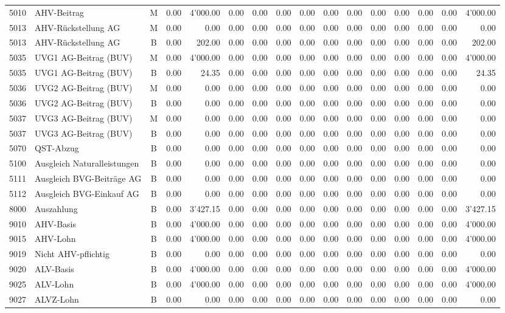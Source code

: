 \documentclass[8pt,a4paper]{extarticle}
\begin{document}
\begin{longtable}{@{\extracolsep{\fill}} l l c r r r r r r r r r r r r r}
5010&AHV-Beitrag&M&0.00&4'000.00&0.00&0.00&0.00&0.00&0.00&0.00&0.00&0.00&0.00&0.00&4'000.00\\
5013&AHV-Rückstellung AG&M&0.00&0.00&0.00&0.00&0.00&0.00&0.00&0.00&0.00&0.00&0.00&0.00&0.00\\
5013&AHV-Rückstellung AG&B&0.00&202.00&0.00&0.00&0.00&0.00&0.00&0.00&0.00&0.00&0.00&0.00&202.00\\
5035&UVG1 AG-Beitrag (BUV)&M&0.00&4'000.00&0.00&0.00&0.00&0.00&0.00&0.00&0.00&0.00&0.00&0.00&4'000.00\\
5035&UVG1 AG-Beitrag (BUV)&B&0.00&24.35&0.00&0.00&0.00&0.00&0.00&0.00&0.00&0.00&0.00&0.00&24.35\\
5036&UVG2 AG-Beitrag (BUV)&M&0.00&0.00&0.00&0.00&0.00&0.00&0.00&0.00&0.00&0.00&0.00&0.00&0.00\\
5036&UVG2 AG-Beitrag (BUV)&B&0.00&0.00&0.00&0.00&0.00&0.00&0.00&0.00&0.00&0.00&0.00&0.00&0.00\\
5037&UVG3 AG-Beitrag (BUV)&M&0.00&0.00&0.00&0.00&0.00&0.00&0.00&0.00&0.00&0.00&0.00&0.00&0.00\\
5037&UVG3 AG-Beitrag (BUV)&B&0.00&0.00&0.00&0.00&0.00&0.00&0.00&0.00&0.00&0.00&0.00&0.00&0.00\\
5070&QST-Abzug&B&0.00&0.00&0.00&0.00&0.00&0.00&0.00&0.00&0.00&0.00&0.00&0.00&0.00\\
5100&Ausgleich Naturalleistungen&B&0.00&0.00&0.00&0.00&0.00&0.00&0.00&0.00&0.00&0.00&0.00&0.00&0.00\\
5111&Ausgleich BVG-Beiträge AG&B&0.00&0.00&0.00&0.00&0.00&0.00&0.00&0.00&0.00&0.00&0.00&0.00&0.00\\
5112&Ausgleich BVG-Einkauf AG&B&0.00&0.00&0.00&0.00&0.00&0.00&0.00&0.00&0.00&0.00&0.00&0.00&0.00\\
8000&Auszahlung&B&0.00&3'427.15&0.00&0.00&0.00&0.00&0.00&0.00&0.00&0.00&0.00&0.00&3'427.15\\
9010&AHV-Basis&B&0.00&4'000.00&0.00&0.00&0.00&0.00&0.00&0.00&0.00&0.00&0.00&0.00&4'000.00\\
9015&AHV-Lohn&B&0.00&4'000.00&0.00&0.00&0.00&0.00&0.00&0.00&0.00&0.00&0.00&0.00&4'000.00\\
9019&Nicht AHV-pflichtig&B&0.00&0.00&0.00&0.00&0.00&0.00&0.00&0.00&0.00&0.00&0.00&0.00&0.00\\
9020&ALV-Basis&B&0.00&4'000.00&0.00&0.00&0.00&0.00&0.00&0.00&0.00&0.00&0.00&0.00&4'000.00\\
9025&ALV-Lohn&B&0.00&4'000.00&0.00&0.00&0.00&0.00&0.00&0.00&0.00&0.00&0.00&0.00&4'000.00\\
9027&ALVZ-Lohn&B&0.00&0.00&0.00&0.00&0.00&0.00&0.00&0.00&0.00&0.00&0.00&0.00&0.00\\

\end{longtable}
\end{document}

